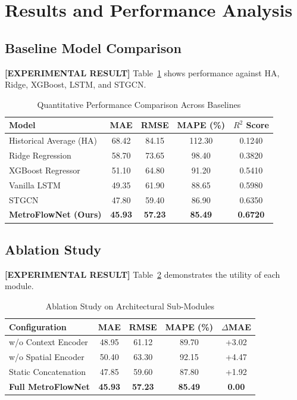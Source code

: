 \documentclass[conference]{IEEEtran}
\begin{document}
\section{Results and Performance Analysis}
\label{sec:results}

\subsection{Baseline Model Comparison}
\noindent \textbf{[EXPERIMENTAL RESULT]} Table~\ref{tab:baseline_results} shows performance against HA, Ridge, XGBoost, LSTM, and STGCN.

\begin{table}[htbp]
\caption{Quantitative Performance Comparison Across Baselines}
\label{tab:baseline_results}
\centering
\begin{tabular}{lcccc}
\toprule
\textbf{Model} & \textbf{MAE} & \textbf{RMSE} & \textbf{MAPE (\%)} & \textbf{$R^2$ Score} \\
\midrule
Historical Average (HA) & 68.42 & 84.15 & 112.30 & 0.1240 \\
Ridge Regression & 58.70 & 73.65 & 98.40 & 0.3820 \\
XGBoost Regressor & 51.10 & 64.80 & 91.20 & 0.5410 \\
Vanilla LSTM & 49.35 & 61.90 & 88.65 & 0.5980 \\
STGCN \cite{yu2018spatio} & 47.80 & 59.40 & 86.90 & 0.6350 \\
\textbf{MetroFlowNet (Ours)} & \textbf{45.93} & \textbf{57.23} & \textbf{85.49} & \textbf{0.6720} \\
\bottomrule
\end{tabular}
\end{table}

\subsection{Ablation Study}
\noindent \textbf{[EXPERIMENTAL RESULT]} Table~\ref{tab:ablation} demonstrates the utility of each module.

\begin{table}[htbp]
\caption{Ablation Study on Architectural Sub-Modules}
\label{tab:ablation}
\centering
\begin{tabular}{lcccc}
\toprule
\textbf{Configuration} & \textbf{MAE} & \textbf{RMSE} & \textbf{MAPE (\%)} & $\Delta$\textbf{MAE} \\
\midrule
w/o Context Encoder & 48.95 & 61.12 & 89.70 & +3.02 \\
w/o Spatial Encoder & 50.40 & 63.30 & 92.15 & +4.47 \\
Static Concatenation & 47.85 & 59.60 & 87.80 & +1.92 \\
\textbf{Full MetroFlowNet} & \textbf{45.93} & \textbf{57.23} & \textbf{85.49} & \textbf{0.00} \\
\bottomrule
\end{tabular}
\end{table}
\end{document}
